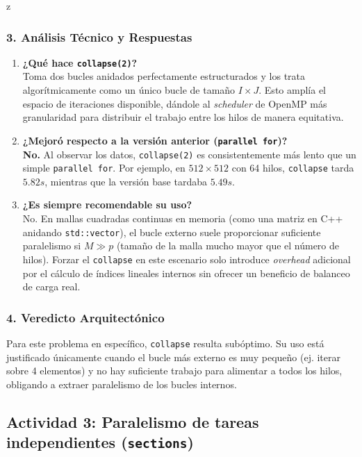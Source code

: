 z\documentclass[11pt,a4paper]{article}
\begin{document}
\subsubsection*{3. Análisis Técnico y Respuestas}

\begin{enumerate}
    \item \textbf{¿Qué hace \texttt{collapse(2)}?} \\
    Toma dos bucles anidados perfectamente estructurados y los trata algorítmicamente como un único bucle de tamaño $I \times J$. Esto amplía el espacio de iteraciones disponible, dándole al \textit{scheduler} de OpenMP más granularidad para distribuir el trabajo entre los hilos de manera equitativa.

    \item \textbf{¿Mejoró respecto a la versión anterior (\texttt{parallel for})?} \\
    \textbf{No.} Al observar los datos, \texttt{collapse(2)} es consistentemente más lento que un simple \texttt{parallel for}. Por ejemplo, en $512 \times 512$ con 64 hilos, \texttt{collapse} tarda $5.82s$, mientras que la versión base tardaba $5.49s$. 

    \item \textbf{¿Es siempre recomendable su uso?} \\
    No. En mallas cuadradas continuas en memoria (como una matriz en C++ anidando \texttt{std::vector}), el bucle externo suele proporcionar suficiente paralelismo si $M \gg p$ (tamaño de la malla mucho mayor que el número de hilos). Forzar el \texttt{collapse} en este escenario solo introduce \textit{overhead} adicional por el cálculo de índices lineales internos sin ofrecer un beneficio de balanceo de carga real.
\end{enumerate}

\subsubsection*{4. Veredicto Arquitectónico}
Para este problema en específico, \texttt{collapse} resulta subóptimo. Su uso está justificado únicamente cuando el bucle más externo es muy pequeño (ej. iterar sobre 4 elementos) y no hay suficiente trabajo para alimentar a todos los hilos, obligando a extraer paralelismo de los bucles internos.


\subsection*{Actividad 3: Paralelismo de tareas independientes (\texttt{sections})}
\end{document}
